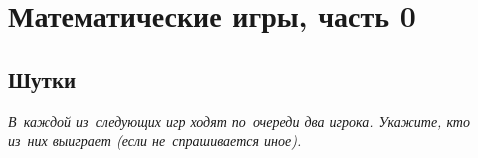 

\section*{Математические игры, часть 0}



\subsection*{Шутки}

\emph{%
В~каждой из~следующих игр ходят по~очереди два игрока.
Укажите, кто из~них выиграет (если не~спрашивается иное).}

